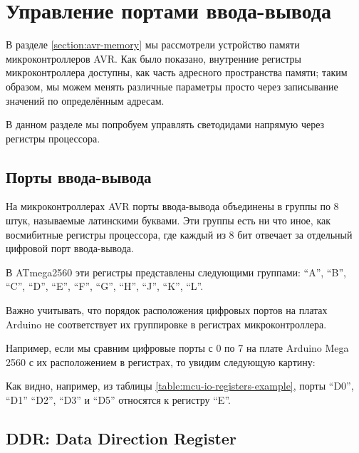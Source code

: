\documentclass[../sparc.tex]{subfiles}
\begin{document}
\newpage
\section{Управление портами ввода-вывода}

В разделе \ref{section:avr-memory} мы рассмотрели устройство памяти
микроконтроллеров AVR.  Как было показано, внутренние регистры микроконтроллера
доступны, как часть адресного пространства памяти; таким образом, мы можем
менять различные параметры просто через записывание значений по определённым
адресам.

В данном разделе мы попробуем управлять светодидами напрямую через регистры
процессора.

\subsection{Порты ввода-вывода}
\label{subsection:io-ports}

На микроконтроллерах AVR порты ввода-вывода объединены в группы по 8 штук,
называемые латинскими буквами.  Эти группы есть ни что иное, как восмибитные
регистры процессора, где каждый из 8 бит отвечает за отдельный цифровой порт
ввода-вывода.

В ATmega2560 эти регистры представлены\cite[96-100]{avr:atmega2560-datasheet}
следующими группами: ``A'', ``B'', ``C'', ``D'', ``E'', ``F'', ``G'', ``H'',
``J'', ``K'', ``L''.

Важно учитывать, что порядок расположения цифровых портов на платах Arduino не
соответствует их группировке в регистрах микроконтроллера.

Например, если мы сравним цифровые порты с 0 по 7 на плате Arduino Mega 2560 с
их расположением в регистрах, то увидим следующую картину:


Как видно, например, из таблицы \ref{table:mcu-io-registers-example}, порты
``D0'', ``D1'' ``D2'', ``D3'' и ``D5'' относятся к регистру ``E''.

\subsection{DDR: Data Direction Register}
\end{document}
